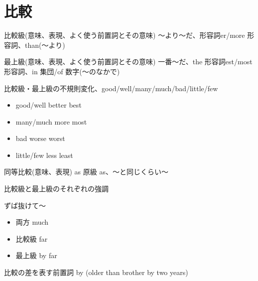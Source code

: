 \documentclass[10pt]{jsarticle}
\newcommand{\answer}[2]{{\color{orange}#2}}
\newcommand{\answer}[2]{\vspace{#1mm}}
\begin{document}
\newpage
\section{比較}

\begin{itembox}[l]{比較級(意味、表現、よく使う前置詞とその意味)}
	\answer{10}{〜より〜だ、形容詞er/more 形容詞、than(〜より)}
\end{itembox}

\begin{itembox}[l]{最上級(意味、表現、よく使う前置詞とその意味)}
	\answer{20}{一番〜だ、the 形容詞est/most 形容詞、in 集団/of 数字(〜のなかで)}
\end{itembox}

\begin{itembox}[l]{比較級・最上級の不規則変化、good/well/many/much/bad/little/few}
	\begin{multicols}{2}
		\begin{itemize}
			\item good/well  \answer{5}{better best}
			\item many/much  \answer{5}{more most}
			\item bad  \answer{5}{worse worst}
			\item little/few  \answer{5}{less least}
		\end{itemize}
	\end{multicols}
\end{itembox}



\begin{itembox}[l]{同等比較(意味、表現)}
	\answer{10}{as 原級 as、〜と同じくらい〜}
\end{itembox}

\begin{itembox}[l]{比較級と最上級のそれぞれの強調}
	\answer{10}{
		ずば抜けて〜
		\begin{multicols}{3}
			\begin{itemize}
				\item 両方 much
				\item 比較級 far
				\item 最上級 by far
			\end{itemize}
		\end{multicols}
	}
\end{itembox}

\begin{itembox}[l]{比較の差を表す前置詞}
	\answer{10}{by (older than brother by two years)}
\end{itembox}
\end{document}

